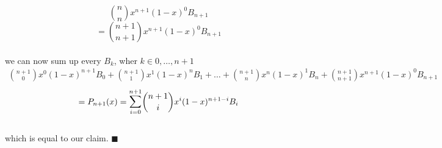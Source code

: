 \begin{equation*}
    {n \choose n}x^{n+1} (1-x)^0 B_{n+1}
\end{equation*}
\begin{equation*}
    ={n+1 \choose n+1}x^{n+1} (1-x)^0 B_{n+1}
\end{equation*}
\\
we can now sum up every $B_k$, wher $k \in {0, \ldots, n+1}$
\begin{gather*}
    {n+1 \choose 0}x^0 (1-x)^{n+1}B_0 + {n+1 \choose 1}x^1(1-x)^{n}B_1 + \ldots + {n+1 \choose n}x^n(1-x)^{1}B_n + {n+1 \choose n+1}x^{n+1} (1-x)^0 B_{n+1}
\end{gather*}
\begin{equation*}
    = P_{n+1}(x)=\mathlarger{\sum}_{i = 0}^{n+1} {n+1 \choose i}x^i (1-x)^{n+1-i} B_i
\end{equation*}
\\
which is equal to our claim. $ \blacksquare$